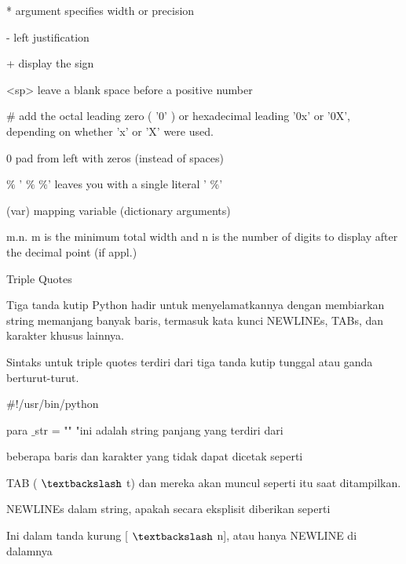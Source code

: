 * \hspace*{0.5in} argument specifies width or precision \par
- \hspace*{0.5in} left justification \par
+ \hspace*{0.5in} display the sign \par
<sp> \hspace*{0.5in} leave a blank space before a positive number \par
 $  \#  $ \hspace*{0.5in} add the octal leading zero ( '0' ) or hexadecimal leading '0x' or '0X', depending on whether 'x' or 'X' were used. \par
0 \hspace*{0.5in} pad from left with zeros (instead of spaces) \par
 $  \%  $ \hspace*{0.5in} ' $  \%  $ $  \%  $' leaves you with a single literal ' $  \%  $' \par
(var) \hspace*{0.5in} mapping variable (dictionary arguments) \par
m.n. \hspace*{0.5in} m is the minimum total width and n is the number of digits to display after the decimal point (if appl.) \par
\vspace{12pt}
Triple Quotes \par
\vspace{12pt}
Tiga tanda kutip Python hadir untuk menyelamatkannya dengan membiarkan string memanjang banyak baris, termasuk kata kunci NEWLINEs, TABs, dan karakter khusus lainnya. \par
Sintaks untuk triple quotes terdiri dari tiga tanda kutip tunggal atau ganda berturut-turut. \par
\vspace{12pt}
 $  \#  $!/usr/bin/python \par
\vspace{12pt}
para $  \_  $str = "" "ini adalah string panjang yang terdiri dari \par
beberapa baris dan karakter yang tidak dapat dicetak seperti \par
TAB ( $  \textbackslash  $ t) dan mereka akan muncul seperti itu saat ditampilkan. \par
NEWLINEs dalam string, apakah secara eksplisit diberikan seperti \par
Ini dalam tanda kurung [ $  \textbackslash  $ n], atau hanya NEWLINE di dalamnya \par

